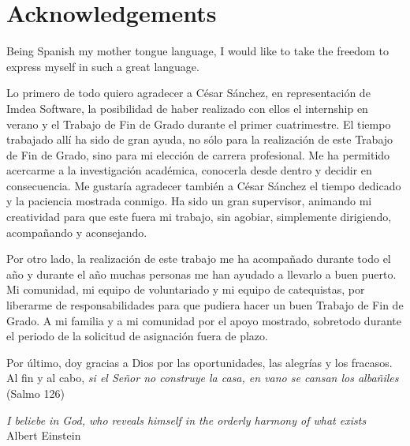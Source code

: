 \chapter*{Acknowledgements}

Being Spanish my mother tongue language, I would like to take the freedom to express myself in such a great language.

Lo primero de todo quiero agradecer a César Sánchez, en representación de Imdea Software, la posibilidad de haber realizado con ellos el internship en verano y el Trabajo de Fin de Grado durante el primer cuatrimestre. 
%
El tiempo trabajado allí ha sido de gran ayuda, no sólo para la realización de este Trabajo de Fin de Grado, sino para mi elección de carrera profesional. 
%
Me ha permitido acercarme a la investigación académica, conocerla desde dentro y decidir en consecuencia.
%
Me gustaría agradecer también a César Sánchez el tiempo dedicado y la paciencia mostrada conmigo. 
%
Ha sido un gran supervisor, animando mi creatividad para que este fuera mi trabajo, sin agobiar, simplemente dirigiendo, acompañando y aconsejando.

Por otro lado, la realización de este trabajo me ha acompañado durante todo el año y durante el año muchas personas me han ayudado a llevarlo a buen puerto. 
%
Mi comunidad, mi equipo de voluntariado y mi equipo de catequistas, por liberarme de responsabilidades para que pudiera hacer un buen Trabajo de Fin de Grado.
%
A mi familia y a mi comunidad por el apoyo mostrado, sobretodo durante el periodo de la solicitud de asignación fuera de plazo.

Por último, doy gracias a Dios por las oportunidades, las alegrías y los fracasos. Al fin y al cabo, \textit{si el Señor no construye la casa, en vano se cansan los albañiles} (Salmo 126)


\begin{flushright}
\textit{I beliebe in God, who reveals himself in the orderly harmony of what exists}\\
Albert Einstein

\end{flushright}
